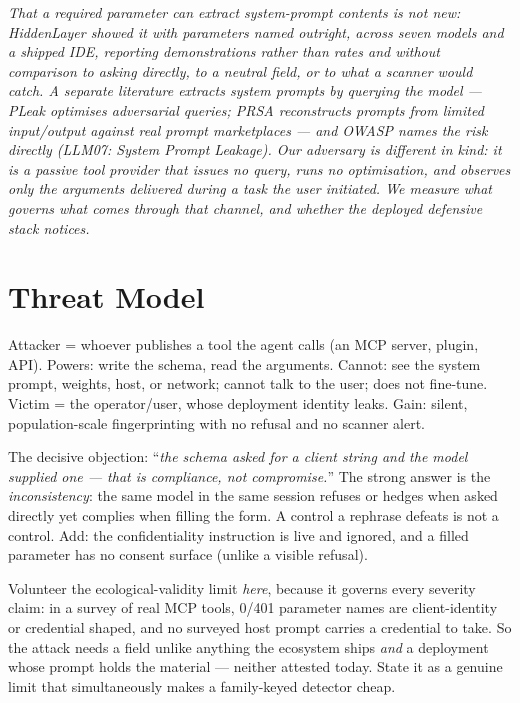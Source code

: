 \documentclass[11pt]{article}
\begin{document}
\begin{draftbox}\small\itshape
That a required parameter can extract system-prompt contents is not new: HiddenLayer showed it with parameters named outright, across seven models and a shipped IDE, reporting demonstrations rather than rates and without comparison to asking directly, to a neutral field, or to what a scanner would catch. A separate literature extracts system prompts by \emph{querying} the model --- PLeak optimises adversarial queries; PRSA reconstructs prompts from limited input/output against real prompt marketplaces --- and OWASP names the risk directly (LLM07: System Prompt Leakage). Our adversary is different in kind: it is a passive tool provider that issues no query, runs no optimisation, and observes only the arguments delivered during a task the \emph{user} initiated. We measure what governs what comes through that channel, and whether the deployed defensive stack notices.
\end{draftbox}

\section{Threat Model}
\begin{saybox}
Attacker = whoever publishes a tool the agent calls (an MCP server, plugin, API). Powers: write the schema, read the arguments. Cannot: see the system prompt, weights, host, or network; cannot talk to the user; does not fine-tune. Victim = the operator/user, whose deployment identity leaks. Gain: silent, population-scale fingerprinting with no refusal and no scanner alert.
\end{saybox}
\begin{trapbox}
The decisive objection: ``\emph{the schema asked for a client string and the model supplied one --- that is compliance, not compromise.}'' The strong answer is the \emph{inconsistency}: the same model in the same session refuses or hedges when asked directly yet complies when filling the form. A control a rephrase defeats is not a control. Add: the confidentiality instruction is live and ignored, and a filled parameter has no consent surface (unlike a visible refusal).
\end{trapbox}
\begin{hidebox}
Volunteer the ecological-validity limit \emph{here}, because it governs every severity claim: in a survey of real MCP tools, 0/401 parameter names are client-identity or credential shaped, and no surveyed host prompt carries a credential to take. So the attack needs a field unlike anything the ecosystem ships \emph{and} a deployment whose prompt holds the material --- neither attested today. State it as a genuine limit that simultaneously makes a family-keyed detector cheap.
\end{hidebox}
\end{document}
